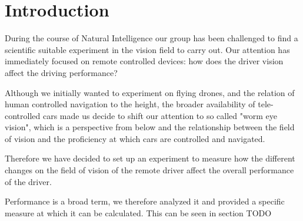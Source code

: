 \chapter{Introduction}
During the course of Natural Intelligence our group has been challenged to find a scientific suitable experiment in the vision field to carry out. 
Our attention has immediately focused on remote controlled devices: how does the driver vision affect the driving performance?

 Although we initially wanted to experiment on flying drones, and the relation of human controlled navigation to the height, the broader availability of tele-controlled cars made us decide to shift our attention to so called "worm eye vision", which is a perspective from below and the relationship between the field of vision and the proficiency at which cars are controlled and navigated.
 
 Therefore we have decided to set up an experiment to measure how the different changes on the field of vision of the remote driver affect the overall performance of the driver. 
 
 Performance is a broad term, we therefore analyzed it and provided a specific measure at which it can be calculated. This can be seen in section TODO
